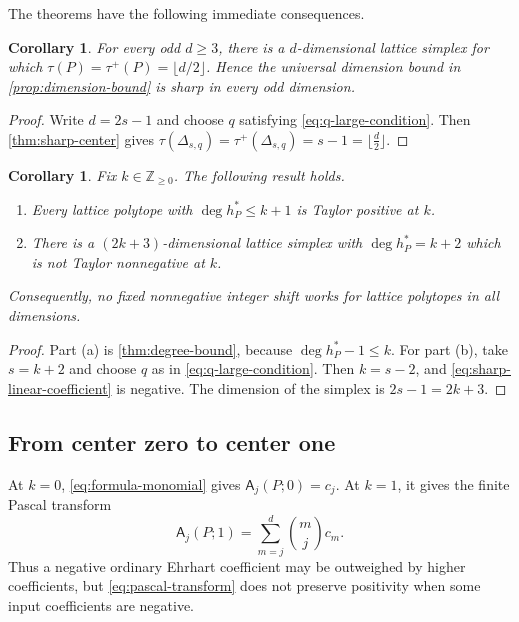 \documentclass[reqno, 12pt]{article}
\numberwithin{equation}{section}
\newtheorem{corollary}[theorem]{Corollary}
\theoremstyle{definition}
\newcommand{\N}{\mathbb{Z}_{\geq 0}}
\newcommand{\A}{\mathsf{A}}
\begin{document}
The theorems have the following immediate consequences.

\begin{corollary}\label{cor:dimension-sharp}
For every odd $d\geq3$, there is a $d$-dimensional lattice simplex for which $\tau(P)=\tau^+(P)=\lfloor d/2\rfloor$.  Hence the universal dimension bound in \cref{prop:dimension-bound} is sharp in every odd dimension.
\end{corollary}
\begin{proof}
Write $d=2s-1$ and choose $q$ satisfying
\eqref{eq:q-large-condition}.  Then \cref{thm:sharp-center} gives $\tau(\Delta_{s,q})=\tau^+(\Delta_{s,q})=s-1=\lfloor\frac d2\rfloor$.
\end{proof}

\begin{corollary}\label{cor:fixed-k}
Fix $k\in\N$. The following result holds.
\begin{enumerate}
 \item[(a)] Every lattice polytope with $\deg h_P^*\leq k+1$ is Taylor positive
 at $k$.
 \item[(b)] There is a $(2k+3)$-dimensional lattice simplex with
 $\deg h_P^*=k+2$ which is not Taylor nonnegative at $k$.
\end{enumerate}
Consequently, no fixed nonnegative integer shift works for lattice polytopes in all dimensions.
\end{corollary}
\begin{proof}
Part (a) is \cref{thm:degree-bound}, because $\deg h_P^*-1\leq k$.  For part (b), take $s=k+2$ and choose $q$ as in
\eqref{eq:q-large-condition}.  Then $k=s-2$, and \eqref{eq:sharp-linear-coefficient} is negative.  The dimension of the
simplex is $2s-1=2k+3$.
\end{proof}

\subsection{From center zero to center one}
\label{sec:shift-one}

At $k=0$, \eqref{eq:formula-monomial} gives
$\A_j(P;0)=c_j$.  At $k=1$, it gives the finite Pascal transform
\begin{equation}\label{eq:pascal-transform}
  \A_j(P;1)=\sum_{m=j}^{d}\binom{m}{j}c_m.
\end{equation}
Thus a negative ordinary Ehrhart coefficient may be outweighed by higher
coefficients, but \eqref{eq:pascal-transform} does not preserve positivity
when some input coefficients are negative.
\end{document}

